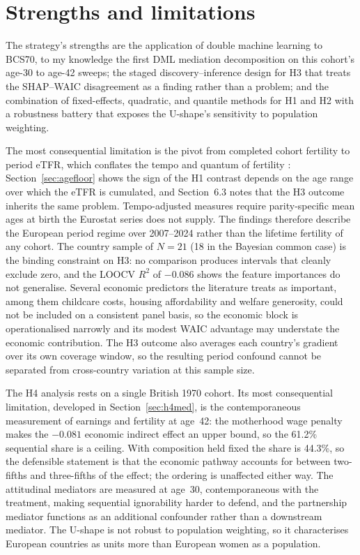 \documentclass[12pt,a4paper]{report}
\begin{document}
\section{Strengths and limitations}
The strategy's strengths are the application of double machine learning \citep{chernozhukov2018} to
BCS70, to my knowledge the first DML mediation decomposition on this cohort's age-30 to age-42
sweeps; the staged discovery--inference design for H3 that treats the SHAP--WAIC disagreement as a
finding rather than a problem; and the combination of fixed-effects, quadratic, and quantile methods
for H1 and H2 with a robustness battery that exposes the U-shape's sensitivity to population weighting.

The most consequential limitation is the pivot from completed cohort
fertility to period eTFR, which conflates the tempo and quantum of fertility
\citep{bongaartsfeeney1998,kohlerphilipov2001}: Section~\ref{sec:agefloor} shows the sign of the H1
contrast depends on the age range over which the eTFR is cumulated, and Section~6.3 notes that the H3
outcome inherits the same problem. Tempo-adjusted measures require parity-specific mean ages at birth
the Eurostat series does not supply. The findings therefore describe the European period regime over
2007--2024 rather than the lifetime fertility of any cohort. The country sample of $N=21$ (18 in the
Bayesian common case) is the binding constraint on H3: no comparison produces intervals that cleanly
exclude zero, and the LOOCV $R^2$ of $-0.086$ shows the feature importances do not generalise. Several
economic predictors the literature treats as important, among them childcare costs, housing
affordability and welfare generosity, could not be included on a consistent panel basis, so the economic
block is operationalised narrowly and its modest WAIC advantage may understate the economic
contribution. The H3 outcome also averages each country's gradient over its own coverage window, so the
resulting period confound cannot be separated from cross-country variation at this sample size.

The H4 analysis rests on a single British 1970 cohort. Its most consequential limitation, developed in
Section~\ref{sec:h4med}, is the contemporaneous measurement of earnings and fertility at age~42: the
motherhood wage penalty makes the $-0.081$ economic indirect effect an upper bound, so the 61.2\%
sequential share is a ceiling. With composition held fixed the share is 44.3\%, so the defensible
statement is that the economic pathway accounts for between two-fifths and three-fifths of the effect;
the ordering is unaffected either way. The attitudinal mediators are measured at age~30, contemporaneous
with the treatment, making sequential ignorability \citep{imai2010} harder to defend, and the
partnership mediator functions as an additional confounder rather than a downstream mediator. The
U-shape is not robust to population weighting, so it characterises European countries as units more
than European women as a population.
\end{document}
